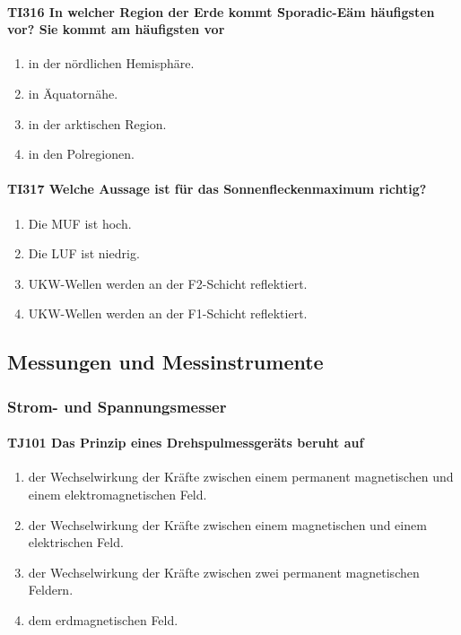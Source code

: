 \documentclass[8pt]{article}
\begin{document}
\paragraph*{TI316 In welcher Region der Erde kommt \"Sporadic-E\" am häufigsten vor? Sie kommt am häufigsten vor}
\begin{enumerate}[nolistsep,label=\Alph*]
\item in der nördlichen Hemisphäre.
\item in Äquatornähe.
\item in der arktischen Region.
\item in den Polregionen.
\end{enumerate}

\paragraph*{TI317 Welche Aussage ist für das Sonnenfleckenmaximum richtig?}
\begin{enumerate}[nolistsep,label=\Alph*]
\item Die MUF ist hoch.
\item Die LUF ist niedrig.
\item UKW-Wellen werden an der F2-Schicht reflektiert.
\item UKW-Wellen werden an der F1-Schicht reflektiert.
\end{enumerate}

\pagebreak
\subsection{Messungen und Messinstrumente}
\subsubsection{Strom- und Spannungsmesser}
\paragraph*{TJ101 Das Prinzip eines Drehspulmessgeräts beruht auf}
\begin{enumerate}[nolistsep,label=\Alph*]
\item der Wechselwirkung der Kräfte zwischen einem permanent magnetischen und einem elektromagnetischen Feld.
\item der Wechselwirkung der Kräfte zwischen einem magnetischen und einem elektrischen Feld. 
\item der Wechselwirkung der Kräfte zwischen zwei permanent magnetischen Feldern.
\item dem erdmagnetischen Feld. 
\end{enumerate}
\end{document}
